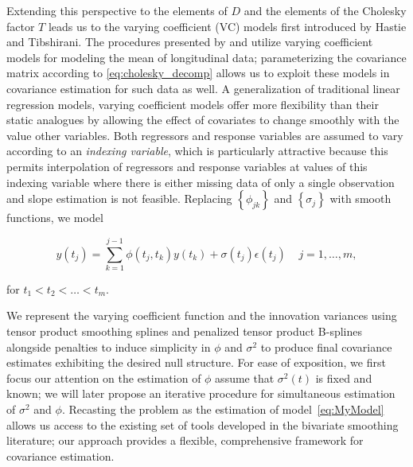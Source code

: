 \documentclass[12pt]{article}
\theoremstyle{definition}
\begin{document}
Extending this perspective to the elements of $D$ and the elements of the Cholesky factor $T$ leads us to  %
the varying coefficient (VC) models first introduced by Hastie and Tibshirani. 
The procedures presented by \citet{fan2000two} and \citet{huang2002varying} utilize varying coefficient models for modeling the mean of longitudinal data; parameterizing the covariance matrix according to \ref{eq:cholesky_decomp} allows us to exploit these models in covariance estimation for such data as well.  A generalization of traditional linear regression models, varying coefficient models offer more flexibility than their static analogues by allowing the effect of covariates to change smoothly with the value other variables. Both regressors and response variables are assumed to vary according to an \emph{indexing variable}, which is particularly attractive because this permits interpolation of regressors and response variables at values of this indexing variable where there is either missing data of only a single observation and slope estimation is not feasible.  Replacing  $\left \{ \phi_{jk} \right\}$ and $\left\{ \sigma_j \right\}$ with smooth functions, we model 

\begin{equation}   
y\left(t_j \right)  = \sum_{k=1}^{j-1} \phi\left(t_j ,t_k\right) y\left(t_k\right) + \sigma\left(t_j\right)\epsilon\left({t_j}\right) \;\;\;\; j=1,\dots, m, 
\label{eq:MyModel} 
\end{equation}

\noindent for $t_1 < t_2 < \dots < t_m$. 

We represent the varying coefficient function and the innovation variances using tensor product smoothing splines and penalized tensor product B-splines alongside penalties to induce simplicity in $\phi$ and $\sigma^2$  to produce final covariance estimates exhibiting the desired null structure.  For ease of exposition, we first focus our attention on the estimation of $\phi$ assume that $\sigma^2\left(t\right)$ is fixed and known; we will later propose an iterative procedure for simultaneous estimation of $\sigma^2$ and $\phi$.    %
Recasting the problem as the estimation of model~\ref{eq:MyModel} allows us access to the existing set of tools developed in the bivariate smoothing literature; our approach provides a flexible, comprehensive framework for covariance estimation.
\end{document}

